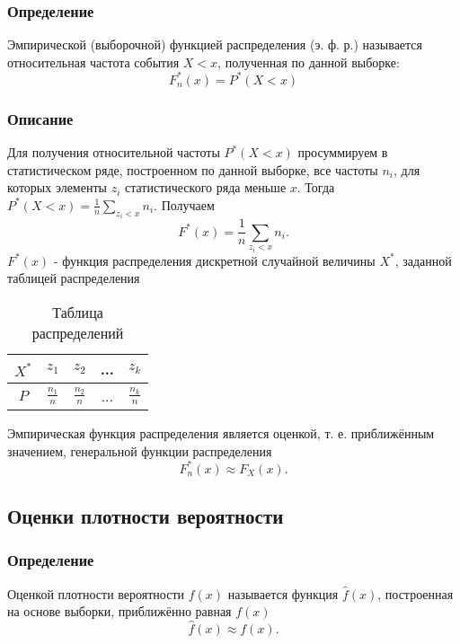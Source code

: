 \subsubsection{Определение}
Эмпирической (выборочной) функцией распределения (э. ф. р.) называется относительная частота события \(X<x\), полученная по данной выборке:
\begin{equation}\label{def}
F^*_n (x) = P^* (X<x)
\end{equation}


\subsubsection{Описание}
Для получения относительной частоты \(P^\ast(X<x)\) просуммируем в статистическом ряде, построенном по данной выборке, все частоты \(n_i\), для которых элементы \(z_i\) статистического ряда меньше \(x\). Тогда \(P^\ast(X<x)=\frac{1}{n}\sum_{z_i <x} n_i.\) Получаем
\begin{equation}\label{descr}
F^\ast(x)=\frac{1}{n}\sum_{z_i <x} n_i.
\end{equation}
\(F^\ast(x)\) - функция распределения дискретной случайной величины \(X^\ast\), заданной таблицей распределения
\begin{table}[!htb]
\centering
\label{tab:tab2}
\begin{tabular}{|c|c|c|c|c|}
\hline
\(X^\ast\) &\(z_1\) & \(z_2\)&...& \(z_k\)\\
\hline
\(P\) &\(\frac{n_1}{n}\) & \(\frac{n_2}{n}\)&...& \(\frac{n_k}{n}\)\\
\hline
\end{tabular}
\centering
\caption{Таблица распределений}
\end{table}
Эмпирическая функция распределения является оценкой, т. е. приближённым значением, генеральной функции распределения
\begin{equation}\label{descr2}
F^\ast_n(x)\approx F_X(x).
\end{equation}



\subsection{Оценки плотности вероятности}
\subsubsection{Определение}
Оценкой плотности вероятности \(f(x)\) называется функция \(\widehat{f}(x)\), построенная на основе выборки, приближённо равная \(f(x)\)
\begin{equation}\label{def2}
\widehat{f}(x)\approx f(x).
\end{equation}

